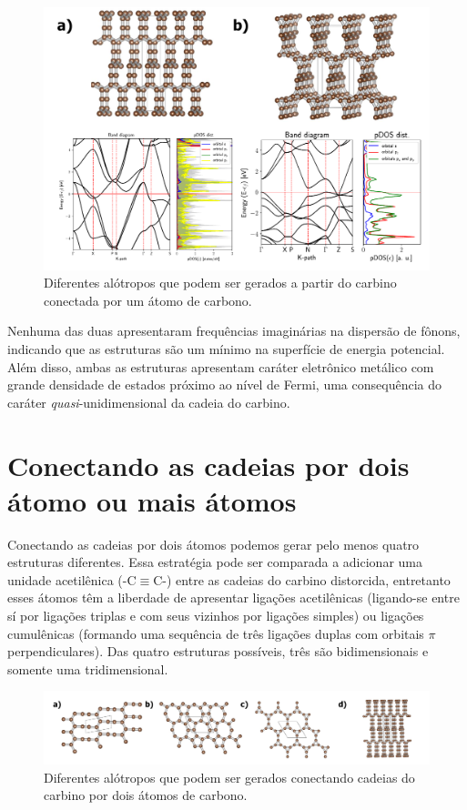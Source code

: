 		\begin{figure}[!ht]
			\centering
			\includegraphics[width=1\linewidth]{capitulos/fig/results3/1atoms}
			\caption{Diferentes alótropos que podem ser gerados a partir do carbino conectada por um átomo de carbono.}
			\label{1atomos}
		\end{figure}
	
		Nenhuma das duas apresentaram frequências imaginárias na dispersão de fônons, indicando que as estruturas são um mínimo na superfície de energia potencial. Além disso, ambas as estruturas apresentam caráter eletrônico metálico com grande densidade de estados próximo ao nível de Fermi, uma consequência do caráter \textit{quasi}-unidimensional da cadeia do carbino.  
			
		
	\section{Conectando as cadeias por dois átomo ou mais átomos}
		
		Conectando as cadeias por dois átomos podemos gerar pelo menos quatro estruturas diferentes. Essa estratégia pode ser comparada a adicionar uma unidade acetilênica (-C$\equiv$C-) entre as cadeias do carbino distorcida, entretanto esses átomos têm a liberdade de apresentar ligações acetilênicas (ligando-se entre sí por ligações triplas e com seus vizinhos por ligações simples) ou ligações cumulênicas (formando uma sequência de três ligações duplas com orbitais $\pi$ perpendiculares). Das quatro estruturas possíveis, três são bidimensionais e somente uma tridimensional.   
		
		\begin{figure}[!ht]
			\centering
			\includegraphics[width=1\linewidth]{capitulos/fig/results3/2atoms}
			\caption{Diferentes alótropos que podem ser gerados conectando cadeias do carbino por dois átomos de carbono.}
			\label{2atomos}
		\end{figure}	
		
